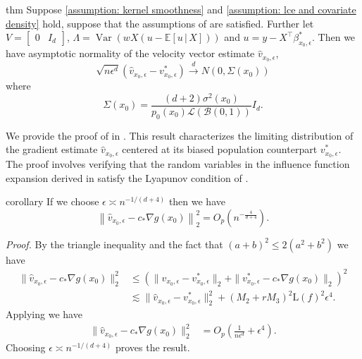 \documentclass[11pt]{article}
\begin{document}
\begin{restatable}{thm}{} \label{corr: central limit for v}
    Suppose \cref{assumption: kernel smoothness} and \cref{assumption: lce and covariate density} hold, suppose that the assumptions of  are satisfied. Further let $V = \begin{bmatrix}
        0 & I_d
    \end{bmatrix}$, $\Lambda = \operatorname{Var}(wX(u - \mathbb{E}[u\,|\,X]))$ and $u = y - X^{\top}\beta_{x_0, \epsilon}^*$. Then we have asymptotic normality of the velocity vector estimate $\hat{v}_{x_0, \epsilon}$,
    \[\sqrt{n\epsilon^{d}}(\hat{v}_{x_0, \epsilon} - v^*_{x_0, \epsilon}) \overset{d}{\rightarrow}N(0, \Sigma(x_0))\]
    where 
    \[\Sigma(x_0) = \frac{(d+2)\sigma^2(x_0)}{p_0(x_0)\mathcal{L}(\mathcal{B}(0,1))} I_d.\]
\end{restatable}
We provide the proof of  in . This result characterizes the limiting distribution of the gradient estimate $\hat v_{x_0, \epsilon}$ centered at its biased population counterpart $v^*_{x_0, \epsilon}$. The proof involves verifying that the random variables in the influence function expansion derived in  satisfy the Lyapunov condition of .

\begin{restatable}{corollary}{} \label{thm: velocity risk}
    If we choose $\epsilon \asymp n^{-1/(d+4)}$ then we have
    \[\left\|\hat{v}_{x_0, \epsilon} - c_*\nabla g(x_0)\right\|_{2}^2  =  O_p\left(n^{-\frac{4}{d+4}}\right). \]
\end{restatable}
\noindent \textit{Proof.} By the triangle inequality and the fact that $(a + b)^2 \leq 2(a^2 + b^2)$  we have
\begin{align*}
    \|\hat{v}_{x_0, \epsilon} - c_*\nabla g(x_0)\|_{2}^2 &\leq \left(\|\hat{v}_{x_0, \epsilon} - v^*_{x_0, \epsilon}\|_{2} + \|v^*_{x_0, \epsilon}  - c_*\nabla g(x_0)\|_{2}\right)^2 \\
    &\lesssim  \|\hat{v}_{x_0, \epsilon} - v^*_{x_0, \epsilon} \|_{2}^2+  (M_2 + rM_3)^2\text{L}(f)^2\epsilon^4.
\end{align*}
Applying  we have
\begin{align*}
   \|\hat{v}_{x_0, \epsilon} - c_*\nabla g(x_0)\|_{2}^2 &=  O_p\left(\frac{1}{n\epsilon^d} + \epsilon^4\right).
\end{align*}
Choosing $\epsilon \asymp n^{-1/(d+4)}$ proves the result.
\end{document}
